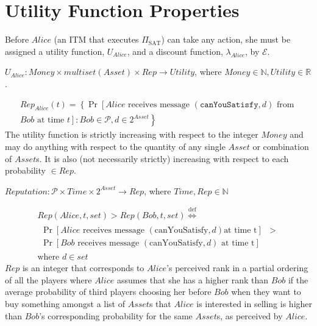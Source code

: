 \section{Utility Function Properties}
  Before $Alice$ (an ITM that executes $\Pi_{\mathrm{SAT}}$) can take any action, she must
  be assigned a utility function, $U_{Alice}$, and a discount function, $\lambda_{Alice}$,
  by $\mathcal{E}$.
  \begin{definition}
    $U_{Alice} : Money \times multiset\left(Asset\right) \times Rep \rightarrow
    Utility$, where $Money \in \mathbb{N}, Utility \in \mathbb{R}$.
  \end{definition}
  \begin{gather*}
    Rep_{Alice}\left(t\right) = \left\{\Pr\left[Alice \mbox{ receives message }
    \left(\mathtt{canYouSatisfy}, d\right) \mbox{ from } \right.\right. \\
    \left.\left. Bob \mbox{ at time } t\right] : Bob \in \mathcal{P}, d \in
    2^{Asset}\right\}
  \end{gather*}
  The utility function is strictly increasing with respect to the integer $Money$ and may
  do anything with respect to the quantity of any single $Asset$ or combination of
  $Asset$s. It is also (not necessarily strictly) increasing with respect to each
  probability $\in Rep$.

  \begin{definition}
    $Reputation : \mathcal{P} \times Time \times 2^{Asset} \rightarrow Rep$, where $Time,
    Rep \in \mathbb{N}$
  \end{definition}
  \begin{gather*}
    Rep\left(Alice, t, set\right) > Rep\left(Bob, t, set\right)
    \overset{\mathrm{def}}{\iff} \\
    \begin{aligned}
      \Pr\left[Alice \mbox{ receives message } \left(\mbox{canYouSatisfy}, d\right) \mbox{
      at time t}\right] &> \\
      \Pr\left[Bob \mbox{ receives message } \left(\mbox{canYouSatisfy}, d\right) \mbox{ at
      time t}\right] &
    \end{aligned} \\
    \mbox{where } d \in set
  \end{gather*}
  $Rep$ is an integer that corresponds to $Alice$'s perceived rank in a partial ordering
  of all the players where $Alice$ assumes that she has a higher rank than $Bob$ if the
  average probability of third players choosing her before $Bob$ when they want to buy
  something amongst a list of $Asset$s that $Alice$ is interested in selling is higher
  than $Bob$'s corresponding probability for the same $Asset$s, as perceived by $Alice$.

